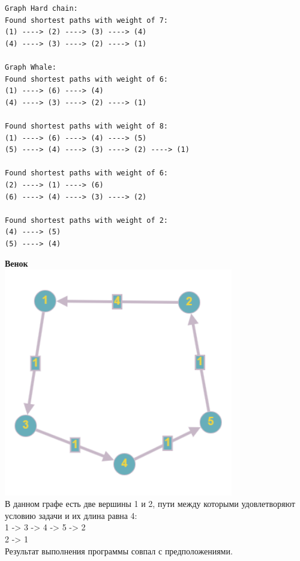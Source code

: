 \documentclass[a4paper,14pt]{extarticle}
\begin{document}
\begin{enumerate}[1.]
\begin{verbatim}
Graph Hard chain:
Found shortest paths with weight of 7:
(1) ----> (2) ----> (3) ----> (4)
(4) ----> (3) ----> (2) ----> (1)

Graph Whale:
Found shortest paths with weight of 6:
(1) ----> (6) ----> (4)
(4) ----> (3) ----> (2) ----> (1)

Found shortest paths with weight of 8:
(1) ----> (6) ----> (4) ----> (5)
(5) ----> (4) ----> (3) ----> (2) ----> (1)

Found shortest paths with weight of 6:
(2) ----> (1) ----> (6)
(6) ----> (4) ----> (3) ----> (2)

Found shortest paths with weight of 2:
(4) ----> (5)
(5) ----> (4)
                    \end{verbatim}
        
        \textbf{Венок}\\
        \includegraphics[width=100mm]{testWreath}\\
        В данном графе есть две вершины 1 и 2, пути между которыми удовлетворяют условию задачи и их длина равна 4:\\
        1 -> 3 -> 4 -> 5 -> 2\\
        2 -> 1\\

        Результат выполнения программы совпал с предположениями.\\


\end{enumerate}
\end{document}
